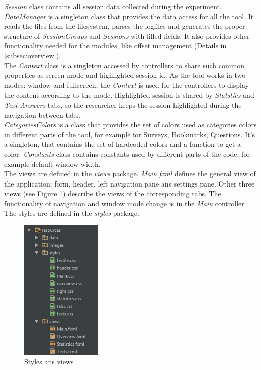 \textit{Session} class contains all session data collected during the experiment. \textit{DataManager} is a singleton class that provides the data access for all the tool. It reads the files from the filesystem, parses the logfiles and generates the proper structure of \textit{SessionGroups} and \textit{Sessions} with filled fields. It also provides other functionality needed for the modules, like offset management (Details in \ref{subsec:overview}).\\

The \textit{Context} class is a singleton accessed by controllers to share such common properties as screen mode and highlighted session id. As the tool works in two modes: window and fullscreen, the \textit{Context} is used for the controllers to display the content according to the mode. Highlighted session is shared by \textit{Statstics} and \textit{Text Answers} tabs, so the researcher keeps the session highlighted during the navigation between tabs.\\

\textit{CategoriesColors} is a class that provides the set of colors used as categories colors in different parts of the tool, for example for Surveys, Bookmarks, Questions. It's a singleton, that contains the set of hardcoded colors and a function to get a color. \textit{Constants} class contains constants used by different parts of the code, for example default window width. \\

The views are defined in the \textit{views} package. \textit{Main.fxml} defines the general view of the application: form, header, left navigation pane ans settings pane. Other three views (see Figure \ref{fig:views}) describe the views of the corresponding tabs. The functionality of navigation and window mode change is in the \textit{Main} controller. The styles are defined in the \textit{styles} package.\\

\begin{figure}[htb]
 \centering
\includegraphics[width=110pt]{figures/views.jpg}
\caption{Styles ans views}
\label{fig:views}
\end{figure}

